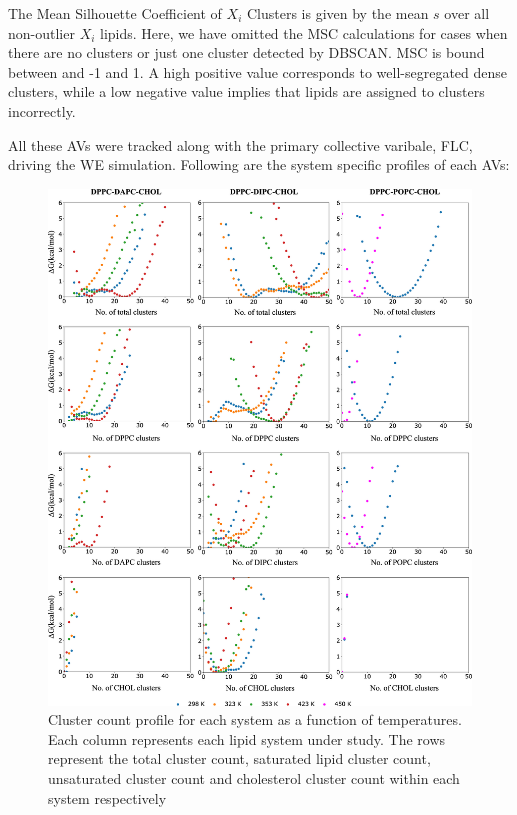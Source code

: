 \documentclass[10pt]{article}
\begin{document}
The Mean Silhouette Coefficient of $X_i$ Clusters is given by the mean $s$ over all non-outlier $X_i$ lipids.
Here, we have omitted the MSC calculations for cases when there are no clusters or just one cluster detected by DBSCAN. 
MSC is bound between and -1 and 1.
A high positive value corresponds to well-segregated dense clusters, while a low negative value implies that lipids are assigned to clusters incorrectly.  

All these AVs were tracked along with the primary collective varibale, FLC, driving the WE simulation.
Following are the system specific profiles of each AVs: 

\begin{figure}[H]
    \centering
    \includegraphics[width=6.5in]{Figures/Supplementary/AVs/ClusterCount/placeholder.jpg}
    \caption{Cluster count profile for each system as a function of temperatures. Each column represents each lipid system under study. The rows represent the total cluster count, saturated lipid cluster count, unsaturated cluster count and cholesterol cluster count within each system respectively}
    \label{figs2:view}
\end{figure}
\end{document}
